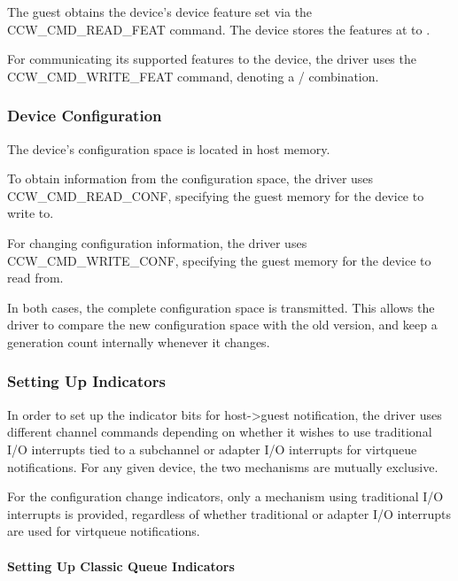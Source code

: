 The guest obtains the device's device feature set via the
CCW_CMD_READ_FEAT command. The device stores the features at 
to .

For communicating its supported features to the device, the driver
uses the CCW_CMD_WRITE_FEAT command, denoting a /
combination.

\subsubsection{Device Configuration}\label{sec:Virtio Transport Options / Virtio over channel I/O / Device Initialization / Device Configuration}

The device's configuration space is located in host memory.

To obtain information from the configuration space, the driver
uses CCW_CMD_READ_CONF, specifying the guest memory for the device
to write to.

For changing configuration information, the driver uses
CCW_CMD_WRITE_CONF, specifying the guest memory for the device to
read from.

In both cases, the complete configuration space is transmitted.  This
allows the driver to compare the new configuration space with the old
version, and keep a generation count internally whenever it changes.

\subsubsection{Setting Up Indicators}\label{sec:Virtio Transport Options / Virtio over channel I/O / Device Initialization / Setting Up Indicators}

In order to set up the indicator bits for host->guest notification,
the driver uses different channel commands depending on whether it
wishes to use traditional I/O interrupts tied to a subchannel or
adapter I/O interrupts for virtqueue notifications. For any given
device, the two mechanisms are mutually exclusive.

For the configuration change indicators, only a mechanism using
traditional I/O interrupts is provided, regardless of whether
traditional or adapter I/O interrupts are used for virtqueue
notifications.

\paragraph{Setting Up Classic Queue Indicators}\label{sec:Virtio Transport Options / Virtio over channel I/O / Device Initialization / Setting Up Indicators / Setting Up Classic Queue Indicators}

